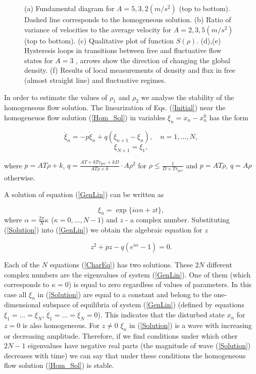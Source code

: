\begin{figure*}
\label{1}

\centerline{  }
\vskip0.3cm
\caption{(a) Fundamental diagram for $A=5,3,2(m/s^2)$ (top to bottom). Dashed line corresponds to the homogeneous solution. (b) Ratio of variance of velocities to the average velocity for $A=2,3,5(m/s^2)$ (top to bottom). (c) Qualitative plot of function $S(\rho)$. (d),(e) Hysteresis loops in transitions between free and fluctuative flow states for $A=3$ , arrows show the direction of changing the global density. (f) Results of local measurements of density and flux in free (almost straight line) and fluctuative regimes.}

\end{figure*}

In order to estimate the values of $\rho_1$ and $\rho_2$ we analyse the
stability of the homogeneous flow solution.
The linearization of Eqs. (\ref{Initial})
near the homogeneuos flow solution (\ref{Hom_Sol})
in variables $\xi_n = x_n - x_n^0$ has the form

\begin{equation} 
\label{GenLin} 
\ddot\xi_n=-p\dot{\xi}_n+q(\xi_{n+1}-\xi_n),\quad n=1,\ldots,N,
\end{equation}
$$
\xi_{N+1}=\xi_1,
$$

where $p=AT\rho+k$, $q=\frac{AT+kTv_{per}+kD}{AT\rho+k}\cdot A\rho^2$ 
for $\rho\leq\frac{1}{D+Tv_{per}}$ and
$p=AT\rho$, $q=A\rho$ otherwise.

A solution of equation (\ref{GenLin}) can be written as

\begin{equation} 
\label{Solution} 
\xi_n=\exp\{i\alpha n+ zt\},
\end{equation}
where $\alpha=\frac{2\pi}{N}\kappa$ ($\kappa=0,\ldots,N-1$) and $z$ - a
complex number. Substituting (\ref{Solution}) into (\ref{GenLin}) we obtain the
algebraic equation for $z$

\begin{equation} 
\label{CharEq} 
z^2+pz-q(e^{i\alpha}-1)=0.
\end{equation}

Each of the $N$ equations (\ref{CharEq}) has two solutions. These $2N$
different complex numbers are the eigenvalues of system (\ref{GenLin}).
One of them (which corresponds to $\kappa=0$) is equal to zero regardless of
values of parameters. In this case all $\xi_n$ in (\ref{Solution})
are equal to a constant and belong to the
one-dimensional subspace of equilibria of system (\ref{GenLin}) (defined by
equations $\xi_1=\ldots=\xi_N$, $\dot{\xi}_1=\ldots=\dot{\xi}_N=0$).
This indicates that the disturbed state $x_n$ for $z=0$ is also
homogeneous. For $z\neq 0$ $\xi_n$ in (\ref{Solution}) is a wave with
increasing or decreasing amplitude. Therefore, if we find conditions under
which other $2N-1$ eigenvalues have negative real parts (the magnitude of wave
(\ref{Solution}) decreases with time) we can say that under these conditions
the homogeneous flow solution (\ref{Hom_Sol}) is stable.

